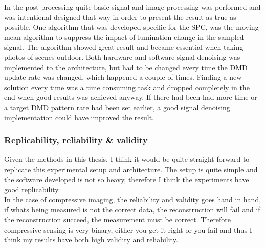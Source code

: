 In the post-processing quite basic signal and image processing was performed and was intentional designed that way in order to present the result as true as possible. One algorithm that was developed specific for the SPC, was the moving mean algorithm to suppress the impact of lumination change in the sampled signal. The algorithm showed great result and became essential when taking photos of scenes outdoor. Both hardware and software signal denoising was implemented to the architecture, but had to be changed every time the DMD update rate was changed, which happened a couple of times. Finding a new solution every time was a time consuming task and dropped completely in the end when good results was achieved anyway. If there had been had more time or a target DMD pattern rate had been set earlier, a good signal denoising implementation could have improved the result.\\[0.1in]

\subsubsection{Replicability, reliability \& validity}
Given the methods in this thesis, I think it would be quite straight forward to replicate this experimental setup and architecture. The setup is quite simple and the software developed is not so heavy, therefore I think the experiments have good replicability.\\[0.1in]

In the case of compressive imaging, the reliability and validity goes hand in hand, if whats being measured is not the correct data, the reconstruction will fail and if the reconstruction succeed, the measurement must be correct. Therefore compressive sensing is very binary, either you get it right or you fail and thus I think my results have both high validity and reliability.  

 





